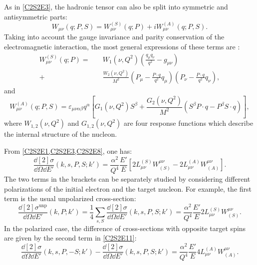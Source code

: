 As in \cref{C2S2E3}, the hadronic tensor can also be split into symmetric and antisymmetric parts:
\begin{equation} \label{C2S2E8}
W_{\mu\nu}(q;P,S) = W_{\mu\nu}^{(S)}(q;P) + iW_{\mu\nu}^{(A)}(q;P,S).
\end{equation}
Taking into account the gauge invariance and parity conservation of the electromagnetic interaction, the most general expressions of these terms are \cite{Anselmino1995}:
\begin{equation} \label{C2S2E9}
\begin{split}
W_{\mu\nu}^{(S)}(q;P) = \quad & W_1(\nu,Q^2)\left(\frac{q_\mu q_\nu}{q^2}-g_{\mu\nu}\right) \\
+ & \frac{W_2(\nu,Q^2)}{M^2}(P_\mu-\frac{P\cdot q}{q^2}q_\mu)(P_\nu-\frac{P\cdot q}{q^2}q_\nu),
\end{split}
\end{equation}
and
\begin{equation} \label{C2S2E10}
W_{\mu\nu}^{(A)}(q;P,S) = \varepsilon_{\mu\nu\alpha\beta}q^\alpha\left[G_1(\nu,Q^2)S^\beta+\frac{G_2(\nu,Q^2)}{M^2}(S^\beta P\cdot q-P^\beta S\cdot q)\right],
\end{equation}
where $W_{1,2}(\nu,Q^2)$ and $G_{1,2}(\nu,Q^2)$ are four response functions which describe the internal structure of the nucleon.

From \cref{C2S2E1,C2S2E3,C2S2E8}, one has:
\begin{equation} \label{C2S2E11}
\frac{\dd[2]{\sigma}}{\dd{\Omega}\dd{E'}}(k,s,P,S;k')= \frac{\alpha^2}{Q^4}\frac{E'}{E}\left[2L_{\mu\nu}^{(S)}W^{\mu\nu}_{(S)}-2L_{\mu\nu}^{(A)}W^{\mu\nu}_{(A)}\right].
\end{equation}
The two terms in the brackets can be separately studied by considering different polarizations of the initial electron and the target nucleon. For example, the first term is the usual unpolarized cross-section:
\begin{equation} \label{C2S2E12}
\frac{\dd[2]{\sigma}^{\mathrm{unp}}}{\dd{\Omega}\dd{E'}}(k,P;k') = \frac{1}{4}\sum_{s,S}\frac{\dd[2]{\sigma}}{\dd{\Omega}\dd{E'}}(k,s,P,S;k') = \frac{\alpha^2}{Q^4}\frac{E'}{E}2L_{\mu\nu}^{(S)}W^{\mu\nu}_{(S)}.
\end{equation}
In the polarized case, the difference of cross-sections with opposite target spins are given by the second term in \cref{C2S2E11}:
\begin{equation} \label{C2S2E13}
\frac{\dd[2]{\sigma}}{\dd{\Omega}\dd{E'}}(k,s,P,-S;k')-\frac{\dd[2]{\sigma}}{\dd{\Omega}\dd{E'}}(k,s,P,S;k') = \frac{\alpha^2}{Q^4}\frac{E'}{E}4L_{\mu\nu}^{(A)}W^{\mu\nu}_{(A)}.
\end{equation}

